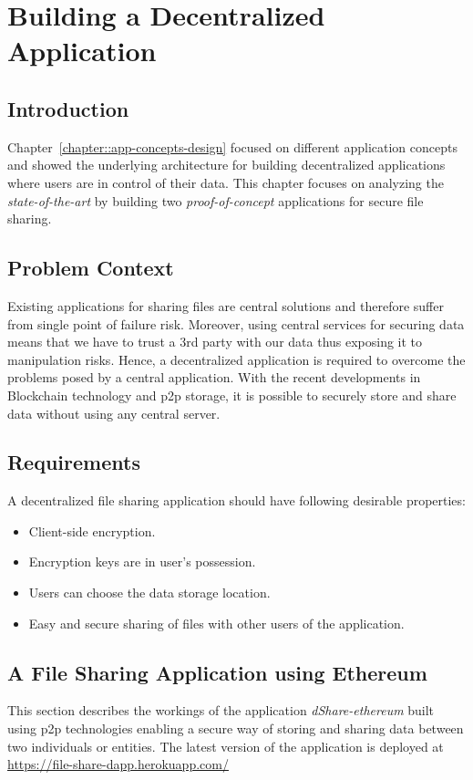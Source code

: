 \chapter{Building a Decentralized Application}\label{chapter:building-dapp}

	\section{Introduction}
	Chapter~\ref{chapter::app-concepts-design} focused on different application concepts and showed the underlying architecture for building decentralized applications where users are in control of their data. This chapter focuses on analyzing the \textit{state-of-the-art} by building two \textit{proof-of-concept} applications for secure file sharing.
	
	\section{Problem Context}
	Existing applications for sharing files are central solutions and therefore suffer from single point of failure risk. Moreover, using central services for securing data means that we have to trust a 3rd party with our data thus exposing it to manipulation risks. Hence, a decentralized application is required to overcome the problems posed by a central application. With the recent developments in Blockchain technology and p2p storage, it is possible to securely store and share data without using any central server.
	
	\section{Requirements}
	A decentralized file sharing application should have following desirable properties:
	\begin{itemize}
		\item Client-side encryption.
		\item Encryption keys are in user's possession.
		\item Users can choose the data storage location.
		\item Easy and secure sharing of files with other users of the application.
	\end{itemize}

	\section{A File Sharing Application using Ethereum}
	This section describes the workings of the application \textit{dShare-ethereum}\cite{harsh_kedia_2019_3359852} built using p2p technologies enabling a secure way of storing and sharing data between two individuals or entities. The latest version of the application is deployed at \url{https://file-share-dapp.herokuapp.com/}
	
